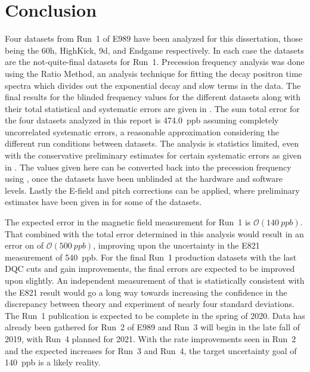 
\thispagestyle{myheadings} %

\chapter{Conclusion}
\label{chapter:Conclusion}


Four datasets from Run~1 of E989 have been analyzed for this dissertation, those being the 60h, HighKick, 9d, and Endgame respectively. In each case the datasets are the not-quite-final datasets for Run~1. Precession frequency analysis was done using the Ratio Method, an analysis technique for fitting the decay positron time spectra which divides out the exponential decay and slow terms in the data. The final results for the blinded frequency \R values for the different datasets along with their total statistical and systematic errors are given in . The sum total error for the four datasets analyzed in this report is \SI{474.0}{ppb} assuming completely uncorrelated systematic errors, a reasonable approximation considering the different run conditions between datasets. The analysis is statistics limited, even with the conservative preliminary estimates for certain systematic errors as given in . The \R values given here can be converted back into the precession frequency \wa using , once the datasets have been unblinded at the hardware and software levels. Lastly the E-field and pitch corrections can be applied, where preliminary estimates have been given in  for some of the datasets. 


The expected error in the magnetic field measurement for Run~1 is $\mathcal{O}(\SI{140}{ppb})$. That combined with the total error determined in this analysis would result in an error on \amu of $\mathcal{O}(\SI{500}{ppb})$, improving upon the uncertainty in the E821 measurement of \SI{540}{ppb}. For the final Run~1 production datasets with the last DQC cuts and gain improvements, the final errors are expected to be improved upon slightly. An independent measurement of \amu that is statistically consistent with the E821 result would go a long way towards increasing the confidence in the discrepancy between theory and experiment of nearly four standard deviations. The Run~1 publication is expected to be complete in the spring of 2020. Data has already been gathered for Run~2 of E989 and Run~3 will begin in the late fall of 2019, with Run~4 planned for 2021. With the rate improvements seen in Run~2 and the expected increases for Run~3 and Run~4, the target uncertainty goal of \SI{140}{ppb} is a likely reality.





